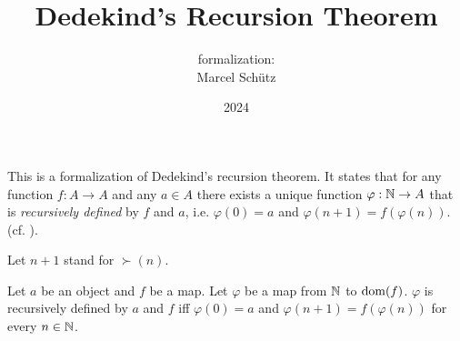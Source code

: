 \documentclass{article}
\title{Dedekind's Recursion Theorem}
\author{\Naproche formalization: \vspace{0.5em} \\
Marcel Schütz}
\date{2024}
\begin{document}
  \maketitle

  \noindent This is a formalization of Dedekind's recursion theorem.
  It states that for any function $f : A \to A$ and any $a \in A$
  there exists a unique function
  $\varphi : \mathbb{N} \to A$ that is \emph{recursively defined} by
  $f$ and $a$, i.e. $\varphi(0) = a$ and
  $\varphi(n + 1) = f(\varphi(n))$.
  (cf. \cite{Ebbinghaus1991}).

  \begin{imports}
    \begin{forthel}
      Let $n + 1$ stand for $\succ(n)$.
    \end{forthel}
  \end{imports}

  \begin{forthel}
    \begin{definition*}\label{ARITHMETIC_02_4608408013504512}
      Let $a$ be an object and $f$ be a map.
      Let $\varphi$ be a map from $\mathbb{N}$ to $\operatorname{dom}(f)$.
      $\varphi$ is recursively defined by $a$ and $f$ iff $\varphi(0) = a$ and $\varphi(n + 1) = f(\varphi(n))$ for every $n \in \mathbb{N}$.
    \end{definition*}
  \end{forthel}
\end{document}
